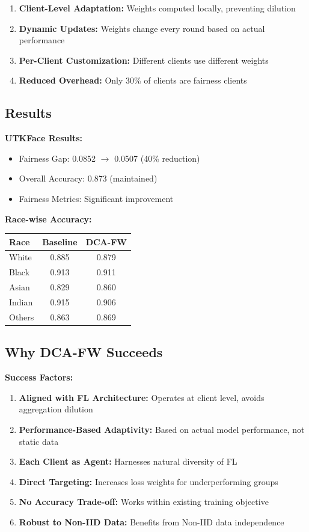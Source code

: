 \documentclass[11pt,a4paper]{report}
\begin{document}
\begin{enumerate}
    \item \textbf{Client-Level Adaptation:} Weights computed locally, preventing dilution
    \item \textbf{Dynamic Updates:} Weights change every round based on actual performance
    \item \textbf{Per-Client Customization:} Different clients use different weights
    \item \textbf{Reduced Overhead:} Only 30\% of clients are fairness clients
\end{enumerate}

\subsection{Results}

\textbf{UTKFace Results:}
\begin{itemize}
    \item Fairness Gap: 0.0852 $\rightarrow$ 0.0507 (40\% reduction)
    \item Overall Accuracy: 0.873 (maintained)
    \item Fairness Metrics: Significant improvement
\end{itemize}

\textbf{Race-wise Accuracy:}
\begin{table}[h]
\centering
\begin{tabular}{lcc}
\toprule
\textbf{Race} & \textbf{Baseline} & \textbf{DCA-FW} \\
\midrule
White & 0.885 & 0.879 \\
Black & 0.913 & 0.911 \\
Asian & 0.829 & 0.860 \\
Indian & 0.915 & 0.906 \\
Others & 0.863 & 0.869 \\
\bottomrule
\end{tabular}
\end{table}

\subsection{Why DCA-FW Succeeds}

\textbf{Success Factors:}
\begin{enumerate}
    \item \textbf{Aligned with FL Architecture:} Operates at client level, avoids aggregation dilution
    \item \textbf{Performance-Based Adaptivity:} Based on actual model performance, not static data
    \item \textbf{Each Client as Agent:} Harnesses natural diversity of FL
    \item \textbf{Direct Targeting:} Increases loss weights for underperforming groups
    \item \textbf{No Accuracy Trade-off:} Works within existing training objective
    \item \textbf{Robust to Non-IID Data:} Benefits from Non-IID data independence
\end{enumerate}
\end{document}

